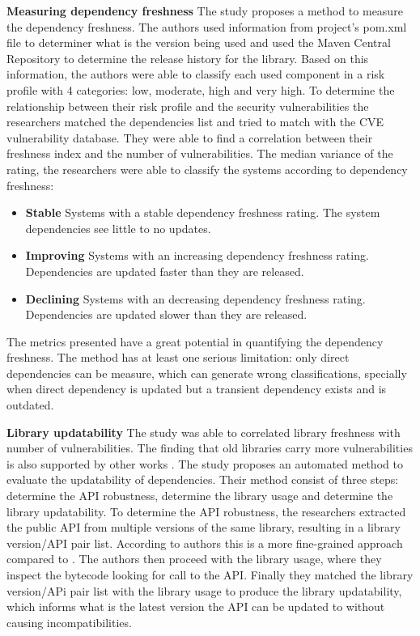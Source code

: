\documentclass[pdf,bookmarks,colorlinks=true]{IEEEtran}
\begin{document}
\textbf{Measuring dependency freshness}
The study \cite{Cox2015} proposes a method to measure the dependency freshness. The authors used information from project's pom.xml file to determiner what is the version being used and used the Maven Central Repository to determine the release history for the library. Based on this information, the authors were able to classify each used component in a risk profile with 4 categories: low, moderate, high and very high.
To determine the relationship between their risk profile and the security vulnerabilities the researchers matched the dependencies list and tried to match with the CVE vulnerability database. They were able to find a correlation between their freshness index and the number of vulnerabilities. The median variance of the rating, the researchers were able to classify the systems according to dependency freshness:
\begin{itemize}
	\item \textbf{Stable} Systems with a stable dependency freshness rating. The system dependencies see little to no updates.
	\item \textbf{Improving} Systems with an increasing dependency freshness
	rating. Dependencies are updated faster than they are released.
	\item \textbf{Declining} Systems with an decreasing dependency freshness
	rating. Dependencies are updated slower than they are released.
\end{itemize}

The metrics presented have a great potential in quantifying the dependency freshness. The method has at least one serious limitation: only direct dependencies can be measure, which can generate wrong classifications, specially when direct dependency is updated but a transient dependency exists and is outdated.  

\textbf{Library updatability}
The study \cite{Cox2015} was able to correlated library freshness with number of vulnerabilities. The finding that old libraries carry more vulnerabilities is also supported by other works \cite{Decan2018,Synopsys2019}. The study \cite{Derr2017} proposes an automated method to evaluate the updatability of dependencies. Their method consist of three steps: determine the API robustness, determine the library usage and determine the library updatability.
To determine the API robustness, the researchers extracted the public API from multiple versions of the same library, resulting in a library version/API pair list. According to authors this is a more fine-grained approach compared to \cite{Backes2016}. The authors then proceed with the library usage, where they inspect the bytecode looking for call to the API. Finally they matched the library version/APi pair list with the library usage to produce the library updatability, which informs what is the latest version the API can be updated to without causing incompatibilities.
\end{document}
